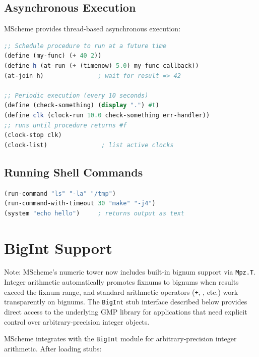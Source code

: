 \documentclass[12pt]{report}
\begin{document}
\section{Asynchronous Execution}

MScheme provides thread-based asynchronous execution:

\begin{lstlisting}[language=Scheme]
;; Schedule procedure to run at a future time
(define (my-func) (+ 40 2))
(define h (at-run (+ (timenow) 5.0) my-func callback))
(at-join h)               ; wait for result => 42

;; Periodic execution (every 10 seconds)
(define (check-something) (display ".") #t)
(define clk (clock-run 10.0 check-something err-handler))
;; runs until procedure returns #f
(clock-stop clk)
(clock-list)               ; list active clocks
\end{lstlisting}

\section{Running Shell Commands}

\begin{lstlisting}[language=Scheme]
(run-command "ls" "-la" "/tmp")
(run-command-with-timeout 30 "make" "-j4")
(system "echo hello")     ; returns output as text
\end{lstlisting}


\chapter{BigInt Support}

Note: MScheme's numeric tower now includes built-in bignum support
via {\tt Mpz.T}.  Integer arithmetic automatically promotes fixnums
to bignums when results exceed the fixnum range, and standard
arithmetic operators ({\tt +}, {\tt *}, etc.) work transparently on
bignums.  The {\tt BigInt} stub interface described below provides
direct access to the underlying GMP library for applications that
need explicit control over arbitrary-precision integer objects.

\medskip\noindent
MScheme integrates with the {\tt BigInt} module for
arbitrary-precision integer arithmetic.  After loading stubs:
\end{document}
